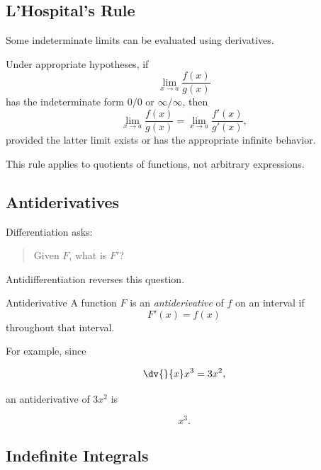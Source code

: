 \subsection{L'Hospital's Rule}
\label{subsec:lhospital-rule}

Some indeterminate limits can be evaluated using derivatives.

\begin{theorem}
Under appropriate hypotheses, if
\[ \lim_{x\to a}\frac{f(x)}{g(x)} \]
has the indeterminate form \(0/0\) or \(\infty/\infty\), then
\[ \lim_{x\to a}\frac{f(x)}{g(x)}
=
\lim_{x\to a}\frac{f'(x)}{g'(x)}, \]
provided the latter limit exists or has the appropriate infinite behavior.
\end{theorem}

This rule applies to quotients of functions, not arbitrary expressions.

\subsection{Antiderivatives}
\label{subsec:antiderivatives}

Differentiation asks:

\begin{quote}
Given \(F\), what is \(F'\)?
\end{quote}

Antidifferentiation reverses this question.

\begin{definitionbox}{Antiderivative}
A function \(F\) is an \emph{antiderivative} of \(f\) on an interval if
\[ F'(x)=f(x) \]
throughout that interval.
\end{definitionbox}

For example, since

\[ \dv{}{x}x^3=3x^2, \]

an antiderivative of \(3x^2\) is

\[ x^3. \]

\subsection{Indefinite Integrals}
\label{subsec:indefinite-integrals}

